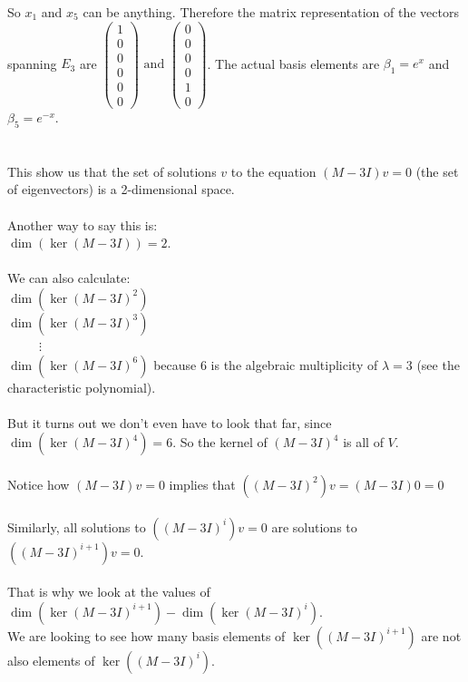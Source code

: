 \documentclass[fontsize=12pt]{scrartcl}
\begin{document}
\noindent
So $x_1$ and $x_5$ can be anything. Therefore the matrix representation of the vectors spanning $E_3$ are $\begin{pmatrix} 1 \\ 0 \\ 0 \\ 0 \\ 0 \\ 0 \end{pmatrix} \mbox{ and } \begin{pmatrix} 0 \\ 0 \\ 0 \\ 0 \\ 1 \\ 0 \end{pmatrix} $. The actual basis elements are $\beta_1 = e^x$ and $\beta_5 = e^{-x}$.\\
\\
\\
This show us that the set of solutions $v$ to the equation $(M - 3I)v = 0$ (the set of eigenvectors) is a 2-dimensional space.\\
\\
Another way to say this is:\\
$\dim(\ker(M - 3I)) = 2$.\\
\\
We can also calculate:\\
$\dim(\ker(M - 3I)^2)$\\
$\dim(\ker(M - 3I)^3)$\\
\ \ \ \ \ $\vdots$\\
$\dim(\ker(M - 3I)^6)$ because 6 is the algebraic multiplicity of $\lambda = 3$ (see the characteristic polynomial).\\
\\
But it turns out we don't even have to look that far, since $\dim(\ker(M - 3I)^4) = 6$. So the kernel of $(M - 3I)^4$ is all of $V$.\\
\\
Notice how $(M - 3I)v = 0$ implies that $((M - 3I)^2)v = (M-3I)0 = 0$\\
\\
Similarly, all solutions to $((M - 3I)^{i})v = 0$ are solutions to $((M - 3I)^{i+1})v = 0$.\\
\\
That is why we look at the values of $\dim(\ker(M - 3I)^{i+1}) - \dim(\ker(M-3I)^{i})$.\\
We are looking to see how many basis elements of $\ker((M - 3I)^{i+1})$ are not also elements of $\ker((M - 3I)^{i})$.\\
\end{document}
